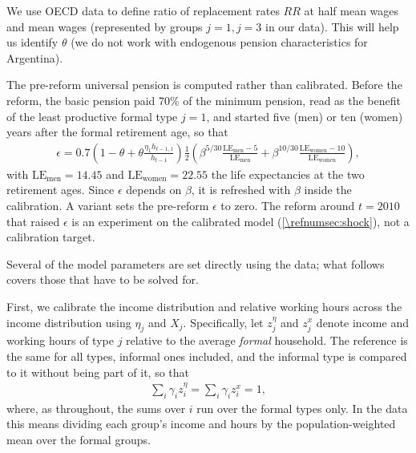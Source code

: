 We use OECD data to define ratio of replacement rates $RR$ at half mean wages and mean wages (represented by groups $j=1, j=3$ in our data). This will help us identify $\theta$ (we do not work with endogenous pension characteristics for Argentina).

The pre-reform universal pension is computed rather than calibrated. Before the reform, the basic pension paid 70\% of the minimum pension, read as the benefit of the least productive formal type $j=1$, and started five (men) or ten (women) years after the formal retirement age, so that
\begin{align*}
    \epsilon = 0.7\left(1-\theta+\theta\frac{\eta_1h_{t-1,1}}{h_{t-1}}\right)\frac{1}{2}\left(\beta^{5/30}\frac{\mathrm{LE_{men}}-5}{\mathrm{LE_{men}}}+\beta^{10/30}\frac{\mathrm{LE_{women}}-10}{\mathrm{LE_{women}}}\right),
\end{align*}
with $\mathrm{LE_{men}} = 14.45$ and $\mathrm{LE_{women}} = 22.55$ the life expectancies at the two retirement ages. Since $\epsilon$ depends on $\beta$, it is refreshed with $\beta$ inside the calibration. A variant sets the pre-reform $\epsilon$ to zero. The reform around $t=2010$ that raised $\epsilon$ is an experiment on the calibrated model (\cref{\refnumsec:shock}), not a calibration target.


Several of the model parameters are set directly using the data; what follows covers those that have to be solved for.

First, we calibrate the income distribution and relative working hours across the income distribution using $\eta_j$ and $X_j$. Specifically, let $z_j^{\eta}$ and $z_j^{x}$ denote income and working hours of type $j$ relative to the average \emph{formal} household. The reference is the same for all types, informal ones included, and the informal type is compared to it without being part of it, so that
\begin{align}\label{\refeq:calibration:z}
    \sum_{i}\gamma_i z_i^{\eta} = \sum_{i}\gamma_i z_i^{x} = 1,
\end{align}
where, as throughout, the sums over $i$ run over the formal types only. In the data this means dividing each group's income and hours by the population-weighted mean over the formal groups.

